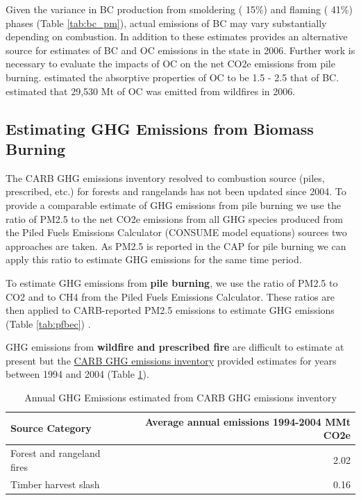 \documentclass[a4paper,titlepage]{article}
\begin{document}
Given the variance in \ac{BC} production from smoldering (\textpm{} 15\%) and flaming (\textpm{} 41\%) phases (Table \ref{tab:bc_pm}), actual emissions of \ac{BC}  may vary substantially depending on combustion. In addition to these estimates \cite{Chow2010} provides an alternative source for estimates of \ac{BC} and \ac{OC} emissions in the state in 2006. Further work is necessary to evaluate the impacts of \ac{OC} on the net \ac{CO2e} emissions from pile burning. \cite{Pokhrel2016} estimated the absorptive properties of \ac{OC} to be 1.5 - 2.5 that of \ac{BC}. \cite{Chow2010} estimated that 29,530 Mt of \ac{OC} was emitted from wildfires in 2006. 

\subsection{Estimating \acl{GHG} Emissions from Biomass Burning}
\label{sec:orgheadline8}
The \ac{CARB} GHG emissions inventory resolved to combustion source (piles, prescribed, etc.) for forests and rangelands has not been updated since 2004. To provide a comparable estimate of GHG emissions from pile burning we use the ratio of \ac{PM2.5} to the net \ac{CO2e} emissions from all \ac{GHG} species produced from the Piled Fuels Emissions Calculator (CONSUME model equations) sources two approaches are taken. As \ac{PM2.5} is reported in the \ac{CAP} for pile burning we can apply this ratio to estimate \ac{GHG} emissions for the same time period.


To estimate \ac{GHG} emissions from \textbf{pile burning}, we use the ratio of
\ac{PM2.5} to CO2 and to CH4 from the Piled Fuels Emissions Calculator. These ratios are then applied to \ac{CARB}-reported \ac{PM2.5} emissions to estimate \ac{GHG} emissions (Table \ref{tab:pfbec}) .


\ac{GHG} emissions from \textbf{wildfire and prescribed fire} are difficult to estimate at present but the
\href{http://www.arb.ca.gov/cc/inventory/archive/tables/net_co2_flux_2007-11-19.pdf}{\ac{CARB} \ac{GHG} emissions inventory} provided estimates for years between 1994 and 2004 (Table \ref{arb_ghg_2004}).

\begin{table}[htb]
\centering
\begin{tabular}{lr}
Source Category & Average annual emissions 1994-2004 MMt CO2e\\
\hline
Forest and rangeland fires & 2.02\\
Timber harvest slash & 0.16\\
\end{tabular}
\caption{Annual \ac{GHG} Emissions estimated from CARB \ac{GHG} emissions inventory \label{arb_ghg_2004}}

\end{table}
\end{document}
